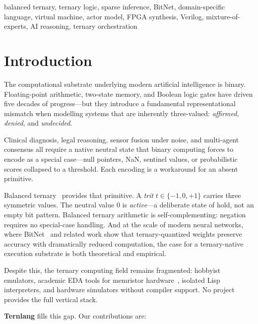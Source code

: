 \documentclass[journal,10pt,twocolumn]{IEEEtran}
\begin{document}
\begin{IEEEkeywords}
balanced ternary, ternary logic, sparse inference, BitNet, domain-specific
language, virtual machine, actor model, FPGA synthesis, Verilog,
mixture-of-experts, AI reasoning, ternary orchestration
\end{IEEEkeywords}

\section{Introduction}
\label{sec:intro}

The computational substrate underlying modern artificial intelligence is
binary. Floating-point arithmetic, two-state memory, and Boolean logic gates
have driven five decades of progress—but they introduce a fundamental
representational mismatch when modelling systems that are inherently
three-valued: \emph{affirmed}, \emph{denied}, and \emph{undecided}.

Clinical diagnosis, legal reasoning, sensor fusion under noise, and
multi-agent consensus all require a native neutral state that binary computing
forces to encode as a special case—null pointers, NaN, sentinel values, or
probabilistic scores collapsed to a threshold. Each encoding is a workaround
for an absent primitive.

Balanced ternary~\cite{knuth1997art} provides that primitive. A \emph{trit}
$t \in \{-1, 0, +1\}$ carries three symmetric values. The neutral value $0$
is \emph{active}—a deliberate state of hold, not an empty bit pattern.
Balanced ternary arithmetic is self-complementing: negation requires no
special-case handling. And at the scale of modern neural networks, where
BitNet~\cite{ma2024era} and related work show that ternary-quantized weights
preserve accuracy with dramatically reduced computation, the case for a
ternary-native execution substrate is both theoretical and empirical.

Despite this, the ternary computing field remains fragmented: hobbyist
emulators, academic EDA tools for memristor hardware~\cite{bos2020ternary},
isolated Lisp interpreters, and hardware simulators without compiler support.
No project provides the full vertical stack.

\textbf{Ternlang} fills this gap. Our contributions are:
\end{document}
